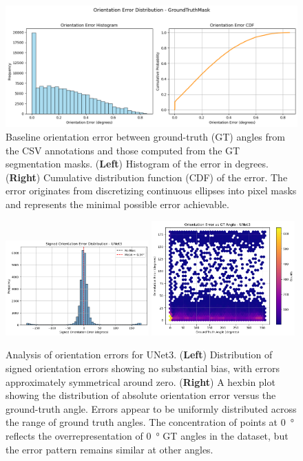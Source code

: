 \begin{figure}[H]
    \centering
    \includegraphics[width=\textwidth]{figures/appendix/gt_orientation_error_distribution.png}
    \caption{
        Baseline orientation error between ground-truth (GT) angles from the CSV annotations and those computed from the GT segmentation masks.
        (\textbf{Left}) Histogram of the error in degrees.
        (\textbf{Right}) Cumulative distribution function (CDF) of the error.
        The error originates from discretizing continuous ellipses into pixel masks and represents the minimal possible error achievable.
    }
    \label{fig:gt-baseline-error}
\end{figure}

\begin{figure}[H]
    \centering
    \includegraphics[width=0.49\textwidth]{figures/appendix/Unet3 Signed Orientation Error Distribution.png}
    \hfill
    \includegraphics[width=0.49\textwidth]{figures/appendix/Unet3 Orientation Error vs GT-Angle.png}
    \caption{
        Analysis of orientation errors for UNet3.
        (\textbf{Left}) Distribution of signed orientation errors showing no substantial bias, with errors approximately symmetrical around zero.
        (\textbf{Right}) A hexbin plot showing the distribution of absolute orientation error versus the ground-truth angle.
        Errors appear to be uniformly distributed across the range of ground truth angles.
        The concentration of points at \qty{0}{\degree} reflects the overrepresentation of \qty{0}{\degree} GT angles in the dataset, but the error pattern remains similar at other angles.
    }
    \label{fig:appendix_unet3_orientation}
\end{figure}

